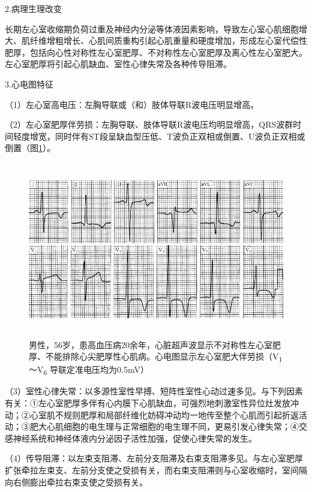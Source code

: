 2.病理生理改变

长期左心室收缩期负荷过重及神经内分泌等体液因素影响，导致左心室心肌细胞增大、肌纤维增粗增长、心肌间质重构引起心肌重量和硬度增加，形成左心室代偿性肥厚，包括向心性对称性左心室肥厚、不对称性左心室肥厚及离心性左心室肥大。左心室肥厚将引起心肌缺血、室性心律失常及各种传导阻滞。

3.心电图特征

（1）左心室高电压：左胸导联或（和）肢体导联R波电压明显增高。

（2）左心室肥厚伴劳损：左胸导联、肢体导联R波电压均明显增高，QRS波群时间轻度增宽，同时伴有ST段呈缺血型压低、T波负正双相或倒置、U波负正双相或倒置（图\ref{fig42-5}）。

\begin{figure}[!htbp]
 \centering
 \includegraphics[width=5.58333in,height=3.02083in]{./images/Image00696.jpg}
 \captionsetup{justification=centering}
 \caption{男性，56岁，患高血压病20余年，心脏超声波显示不对称性左心室肥厚、不能排除心尖肥厚性心肌病。心电图显示左心室肥大伴劳损（V\textsubscript{1}～V\textsubscript{6} 导联定准电压均为0.5mV）}
 \label{fig42-5}
  \end{figure} 


（3）室性心律失常：以多源性室性早搏、短阵性室性心动过速多见。与下列因素有关：①左心室肥厚多伴有心内膜下心肌缺血，可强烈地刺激室性异位灶发放冲动；②心室肌不规则肥厚和局部纤维化妨碍冲动均一地传至整个心肌而引起折返活动；③肥大心肌细胞的电生理与正常细胞的电生理不同，更易引发心律失常；④交感神经系统和神经体液内分泌因子活性加强，促使心律失常的发生。

（4）传导阻滞：以左束支阻滞、左前分支阻滞及右束支阻滞多见。与左心室肥厚扩张牵拉左束支、左前分支使之受损有关，而右束支阻滞则与心室收缩时，室间隔向右侧膨出牵拉右束支使之受损有关。

\protect\hypertarget{text00050.htmlux5cux23subid595}{}{}

